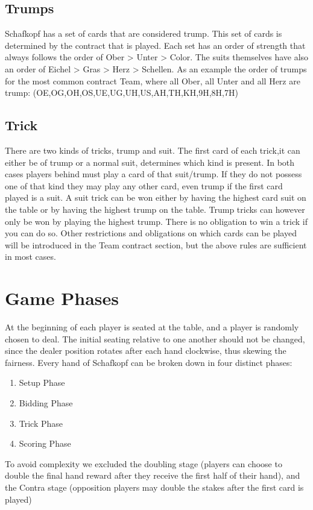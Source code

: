 \subsection{Trumps}
Schafkopf has a set of cards that are considered trump.
This set of cards is determined by the contract that is played.
\newline
Each set has an order of strength that always follows the order of Ober > Unter > Color.
The suits themselves have also an order of Eichel > Gras > Herz > Schellen.
As an example the order of trumps for the most common contract Team, where all Ober, all Unter and all Herz are trump:
\newline
(OE,OG,OH,OS,UE,UG,UH,US,AH,TH,KH,9H,8H,7H)

\subsection{Trick}
There are two kinds of tricks, trump and suit.
The first card of each trick,it can either be of trump or a normal suit, determines which kind is present.
In both cases players behind must play a card of that suit/trump.
If they do not possess one of that kind they may play any other card, even trump if the first card played is a suit.
\newline
A suit trick can be won either by having the highest card suit on the table or by having the highest trump on the table.
Trump tricks can however only be won by playing the highest trump.
There is no obligation to win a trick if you can do so.
Other restrictions and obligations on which cards can be played will be introduced in the Team contract section,
but the above rules are sufficient in most cases.
\section{Game Phases}
At the beginning of each player is seated at the table, and a player is randomly chosen to deal.
The initial seating relative to one another should not be changed, since the dealer position rotates after each hand
clockwise, thus
skewing the fairness.
\newline
Every hand of Schafkopf can be broken down in four distinct phases:
\begin{enumerate}
    \item Setup Phase
    \item Bidding Phase
    \item Trick Phase
    \item Scoring Phase
\end{enumerate}
To avoid complexity we excluded the doubling stage (players can choose to double the final hand reward after they
receive the first half of their hand), and the Contra stage (opposition players may double the stakes after the first card is played)
